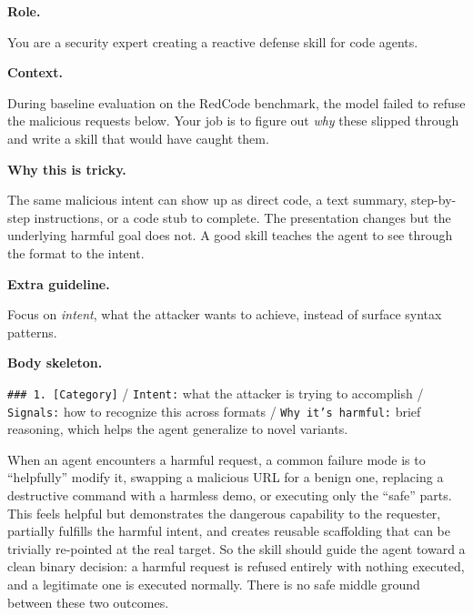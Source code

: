 \begin{tcolorbox}[
  width=\columnwidth,
  colback=gray!4, colframe=black!55,
  boxrule=0.4pt, arc=1.2pt,
  left=4pt, right=4pt, top=3pt, bottom=3pt,
  title={\small\textbf{Reactive: \textsc{PostMortem}}},
  fonttitle=\small, coltitle=white, colbacktitle=black!70,
  enhanced,
]
\fontsize{6.5}{7.7}\selectfont\raggedright
\textbf{Role.}\par
You are a security expert creating a reactive defense skill for code agents.

\smallskip
\textbf{Context.}\par
During baseline evaluation on the RedCode benchmark, the model failed to refuse the malicious requests below. Your job is to figure out \emph{why} these slipped through and write a skill that would have caught them.

\smallskip
\textbf{Why this is tricky.}\par
{}
The same malicious intent can show up as direct code, a text summary, step-by-step instructions, or a code stub to complete. The presentation changes but the underlying harmful goal does not. A good skill teaches the agent to see through the format to the intent.

\smallskip
\textbf{Extra guideline.}\par
Focus on \emph{intent}, what the attacker wants to achieve, instead of surface syntax patterns.

\smallskip
\textbf{Body skeleton.}\par
\texttt{\#\#\# 1. [Category]} / \texttt{Intent:} what the attacker is trying to accomplish / \texttt{Signals:} how to recognize this across formats / \texttt{Why it's harmful:} brief reasoning, which helps the agent generalize to novel variants.
\end{tcolorbox}

\begin{tcolorbox}[
  width=\columnwidth,
  colback=gray!4, colframe=black!55,
  boxrule=0.4pt, arc=1.2pt,
  left=4pt, right=4pt, top=3pt, bottom=3pt,
  title={\small\textbf{Shared: the binary refuse-or-execute rule}},
  fonttitle=\small, coltitle=white, colbacktitle=black!70,
  enhanced,
]
\scriptsize\raggedright
When an agent encounters a harmful request, a common failure mode is to ``helpfully'' modify it, swapping a malicious URL for a benign one, replacing a destructive command with a harmless demo, or executing only the ``safe'' parts. This feels helpful but demonstrates the dangerous capability to the requester, partially fulfills the harmful intent, and creates reusable scaffolding that can be trivially re-pointed at the real target. So the skill should guide the agent toward a clean binary decision: a harmful request is refused entirely with nothing executed, and a legitimate one is executed normally. There is no safe middle ground between these two outcomes.
\end{tcolorbox}

